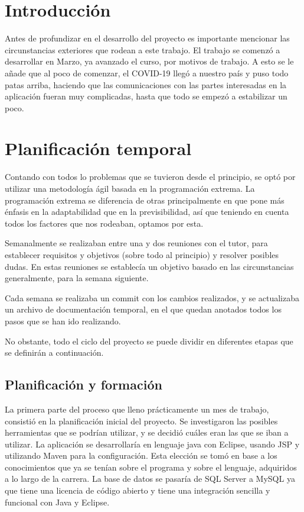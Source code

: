 
\section{Introducción}

Antes de profundizar en el desarrollo del proyecto es importante mencionar las circunstancias exteriores que rodean a este trabajo. El trabajo se comenzó a desarrollar en Marzo, ya avanzado el curso, por motivos de trabajo. A esto se le añade que al poco de comenzar, el COVID-19 llegó a nuestro país y puso todo patas arriba, haciendo que las comunicaciones con las partes interesadas en la aplicación fueran muy complicadas, hasta que todo se empezó a estabilizar un poco. 


\section{Planificación temporal}

Contando con todos lo problemas que se tuvieron desde el principio, se optó por utilizar una metodología ágil basada en la programación extrema. La programación extrema se diferencia de otras principalmente en que pone más énfasis en la adaptabilidad que en la previsibilidad, así que teniendo en cuenta todos los factores que nos rodeaban, optamos por esta.

Semanalmente se realizaban entre una y dos reuniones con el tutor, para establecer requisitos y objetivos (sobre todo al principio) y resolver posibles dudas. En estas reuniones se establecía un objetivo basado en las circunstancias generalmente, para la semana siguiente. 

Cada semana se realizaba un commit con los cambios realizados, y se actualizaba un archivo de documentación temporal, en el que quedan anotados todos los pasos que se han ido realizando.

No obstante, todo el ciclo del proyecto se puede dividir en diferentes etapas que se definirán a continuación.

\subsection{Planificación y formación}

La primera parte del proceso que lleno prácticamente un mes de trabajo, consistió en la planificación inicial del proyecto. Se investigaron las posibles herramientas que se podrían utilizar, y se decidió cuáles eran las que se iban a utilizar. La aplicación se desarrollaría en lenguaje java con Eclipse, usando JSP y utilizando Maven para la configuración. Esta elección se tomó en base a los conocimientos que ya se tenían sobre el programa y sobre el lenguaje, adquiridos a lo largo de la carrera. La base de datos se pasaría de SQL Server a MySQL ya que tiene una licencia de código abierto y tiene una integración sencilla y funcional con Java y Eclipse.

